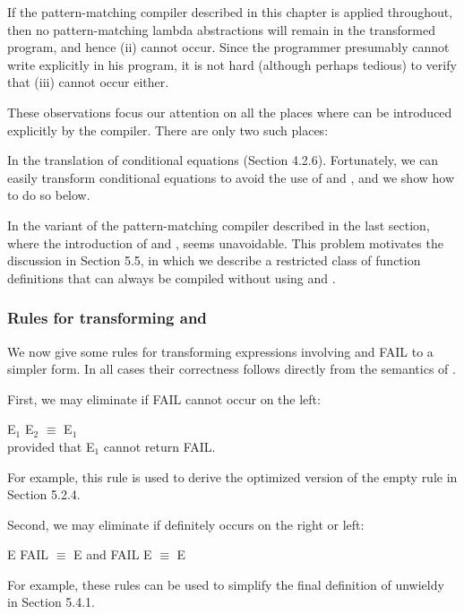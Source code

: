 If the pattern-matching compiler described in this chapter is applied throughout, then no pattern-matching lambda abstractions will remain in the transformed program, and hence (ii) cannot occur. Since the programmer presumably cannot write  explicitly in his program, it is not hard (although perhaps tedious) to verify that (iii) cannot occur either.

These observations focus our attention on all the places where  can be introduced explicitly by the compiler. There are only two such places:
\begin{numbered}
	\item In the translation of conditional equations (Section 4.2.6). Fortunately, we can easily transform conditional equations to avoid the use of \ml{\fatbar{}} and , and we show how to do so below.
	\item In the variant of the pattern-matching compiler described in the last
	section, where the introduction of \ml{\fatbar{}} and , seems unavoidable. This
	problem motivates the discussion in Section 5.5, in which we describe a
	restricted class of function definitions that can always be compiled
	without using \ml{\fatbar{}} and .
\end{numbered}

\subsubsection{Rules for transforming \ml{\fatbar{}} and }
We now give some rules for transforming expressions involving \ml{\fatbar{}} and FAIL to a
simpler form. In all cases their correctness follows directly from the semantics
of \ml{\fatbar{}}.

First, we may eliminate \ml{\fatbar{}} if FAIL cannot occur on the left:
\begin{mlcoded}
E$_1$ \fatbar{} E$_2$ $\equiv$ E$_1$\\
{\normalfont provided that} E$_1$ {\normalfont cannot return} FAIL.
\end{mlcoded}
For example, this rule is used to derive the optimized version of the empty
rule in Section 5.2.4.

Second, we may eliminate \ml{\fatbar{}} if  definitely occurs on the right or left:
\begin{mlcoded}
E \ml{\fatbar{}} FAIL $\equiv$ E {\normalfont and}
FAIL \ml{\fatbar{}} E $\equiv$ E
\end{mlcoded}
For example, these rules can be used to simplify the final definition of unwieldy in
Section 5.4.1.

